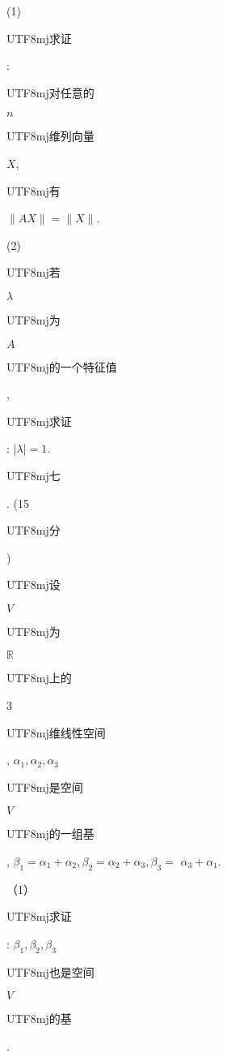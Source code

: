 \documentclass[10pt]{article}
\begin{document}
(1) \begin{CJK}{UTF8}{mj}求证\end{CJK}: \begin{CJK}{UTF8}{mj}对任意的\end{CJK} $n$ \begin{CJK}{UTF8}{mj}维列向量\end{CJK} $X$, \begin{CJK}{UTF8}{mj}有\end{CJK} $\|A X\|=\|X\|$.

(2) \begin{CJK}{UTF8}{mj}若\end{CJK} $\lambda$ \begin{CJK}{UTF8}{mj}为\end{CJK} $A$ \begin{CJK}{UTF8}{mj}的一个特征值\end{CJK}, \begin{CJK}{UTF8}{mj}求证\end{CJK}: $|\lambda|=1$.

\begin{CJK}{UTF8}{mj}七\end{CJK}. (15 \begin{CJK}{UTF8}{mj}分\end{CJK}) \begin{CJK}{UTF8}{mj}设\end{CJK} $V$ \begin{CJK}{UTF8}{mj}为\end{CJK} $\mathbb{R}$ \begin{CJK}{UTF8}{mj}上的\end{CJK} 3 \begin{CJK}{UTF8}{mj}维线性空间\end{CJK}, $\alpha_{1}, \alpha_{2}, \alpha_{3}$ \begin{CJK}{UTF8}{mj}是空间\end{CJK} $V$ \begin{CJK}{UTF8}{mj}的一组基\end{CJK}, $\beta_{1}=\alpha_{1}+\alpha_{2}, \beta_{2}=\alpha_{2}+\alpha_{3}, \beta_{3}=$ $\alpha_{3}+\alpha_{1}$.

（1）\begin{CJK}{UTF8}{mj}求证\end{CJK}: $\beta_{1}, \beta_{2}, \beta_{3}$ \begin{CJK}{UTF8}{mj}也是空间\end{CJK} $V$ \begin{CJK}{UTF8}{mj}的基\end{CJK}.
\end{document}
